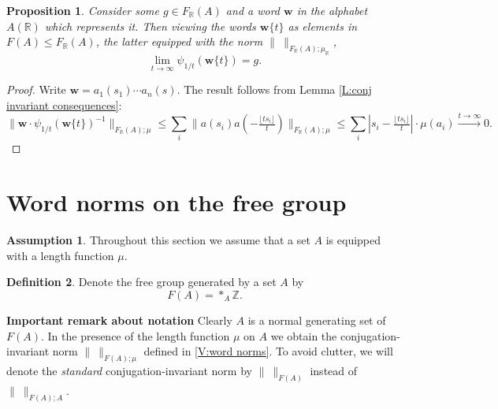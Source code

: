 \documentclass[12pt]{amsart}
\newtheorem{prop}{Proposition}[section]
\theoremstyle{definition}
\newtheorem{defn}[prop]{Definition}
\newtheorem*{assumption*}{Assumption}
\def\RR{\ensuremath{\mathbb{R}}}
\def\ZZ{\ensuremath{\mathbb{Z}}}
\newcommand{\B}[1]{\mathbf{#1}}
\newcommand{\xto}[1]{\xrightarrow{#1}}
\def\Free{F}
\begin{document}
\begin{prop}\label{prop:w truncated}
Consider some $g \in \Free_\RR(A)$ and a word $\B w$ in the alphabet $A(\RR)$ which represents it.
Then viewing the words $\B w\{t\}$ as elements in $\Free(A) \leq \Free_\RR(A)$, the latter equipped with the norm $\| \ \|_{\Free_\RR(A);\mu_\RR}$,
\[
\lim_{t \to \infty} \psi_{1/t}(\B w\{t\}) = g.
\]
\end{prop}

\begin{proof}
Write $\B w=a_1(s_1) \cdots a_n(s)$.
The result follows from Lemma \ref{L:conj invariant consequences}:
\[
\| \B w\cdot \psi_{1/t}(\B w\{t\})^{-1}\|_{\Free_\RR(A);\mu}
\leq
\sum_i \| a(s_i) a(-\tfrac{\lfloor ts_i \rfloor}{t}) \|_{\Free_\RR(A);\mu}
\leq
\sum_i |s_i - \tfrac{\lfloor ts_i \rfloor}{t}| \cdot \mu(a_i) \xto{t \to \infty} 0.
\]
\end{proof}









%
%
\iffalse




%
\section{Word norms on the free group}
\label{Sec:free group}


\begin{assumption*}
Throughout this section we assume that a set $A$ is equipped with a length function $\mu$.
\end{assumption*}




\begin{defn}\label{D:F(A) and metric}
Denote the free group generated by a set $A$ by
\[
\Free(A) = *_A \ZZ.
\]
\end{defn}


\noindent
{\bf Important remark about notation}
Clearly $A$ is a normal generating set of $\Free(A)$.
In the presence of the length function $\mu$ on $A$ we obtain the conjugation-invariant norm $\| \ \|_{F(A);\mu}$ defined in \ref{V:word norms}.
To avoid clutter, we will denote the {\em standard} conjugation-invariant norm by $\| \ \|_{F(A)}$ instead of $\| \ \|_{F(A);A}$.
\end{document}
